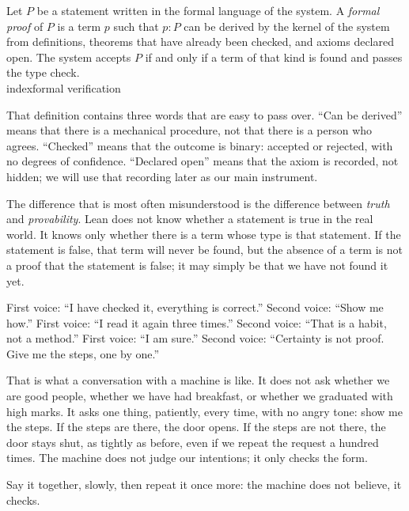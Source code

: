 
\begin{definisi}
Let $P$ be a statement written in the formal language of the system. A \emph{formal proof} of $P$ is
a term $p$ such that $p:P$ can be derived by the kernel of the system from definitions, theorems
that have already been checked, and axioms declared open. The system accepts $P$ if and only if a
term of that kind is found and passes the type check.\\index{formal verification}
\end{definisi}

That definition contains three words that are easy to pass over. ``Can be derived'' means that
there is a mechanical procedure, not that there is a person who agrees. ``Checked'' means that the
outcome is binary: accepted or rejected, with no degrees of confidence. ``Declared open'' means that
the axiom is recorded, not hidden; we will use that recording later as our main instrument.

The difference that is most often misunderstood is the difference between \emph{truth} and
\emph{provability}. Lean does not know whether a statement is true in the real world. It knows only
whether there is a term whose type is that statement. If the statement is false, that term will
never be found, but the absence of a term is not a proof that the statement is false; it may simply
be that we have not found it yet.

\begin{bacakeras}
First voice: ``I have checked it, everything is correct.''
Second voice: ``Show me how.''
First voice: ``I read it again three times.''
Second voice: ``That is a habit, not a method.''
First voice: ``I am sure.''
Second voice: ``Certainty is not proof. Give me the steps, one by one.''

That is what a conversation with a machine is like. It does not ask whether we are good people,
whether we have had breakfast, or whether we graduated with high marks. It asks one thing,
patiently, every time, with no angry tone: show me the steps. If the steps are there, the door
opens. If the steps are not there, the door stays shut, as tightly as before, even if we repeat the
request a hundred times. The machine does not judge our intentions; it only checks the form.

Say it together, slowly, then repeat it once more: the machine does not believe, it checks.
\end{bacakeras}

